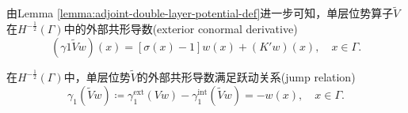由Lemma \ref{lemma:adjoint-double-layer-potential-def}进一步可知，单层位势算子$\widetilde{V}$在$H^{-\frac{1}{2}}(\Gamma)$中的外部共形导数(exterior conormal derivative)
\begin{equation*}
  \left( \gamma{1} \widetilde{V} w \right)(x) =
  \left[
  \sigma(x) - 1
  \right] w(x)
  + \left( K' w \right)(x), \quad x \in \Gamma.
\end{equation*}

\begin{lemma}[单层位势外部共形导数的跃动关系]
  \label{lemma:bvp-jump-relation}
  在$ H^{-\frac{1}{2}}(\Gamma)$中，单层位势$\widetilde{V}$的外部共形导数满足跃动关系(jump relation)
  \begin{equation}
    \label{eq:bvp-jump-relation}
     \gamma_{1} \left( \widetilde{V} w \right)  \coloneqq
    \gamma_{1}^{\text{ext}} \left( V w \right)
    - \gamma_{1}^{\text{int}} \left( \widetilde{V} w \right)
    = - w(x), \quad x \in \Gamma.
  \end{equation}
\end{lemma}


